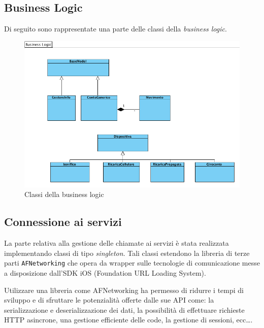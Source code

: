 \subsection{Business Logic}
Di seguito sono rappresentate una parte delle classi della \emph{business logic}.
\begin{figure}[!htbp]
\centering
\includegraphics[scale=0.60]{architettura/businessLogicClass.png}
\caption{Classi della business logic}
\label{fig:businessLogic}
\end{figure}

\subsection{Connessione ai servizi}
\label{parag:networking}
La parte relativa alla gestione delle chiamate ai servizi è stata realizzata implementando classi di tipo \emph{singleton}. Tali classi estendono la libreria di terze parti \texttt{AFNetworking} che opera da wrapper sulle tecnologie di comunicazione messe a disposizione dall'SDK iOS (Foundation URL Loading System). 

Utilizzare una libreria come AFNetworking ha permesso di ridurre i tempi di sviluppo e di sfruttare le potenzialità offerte dalle sue API come: la serializzazione e deserializzazione dei dati, la possibilità di effettuare richieste HTTP asincrone, una gestione efficiente delle code, la gestione di sessioni, ecc\dots.  

